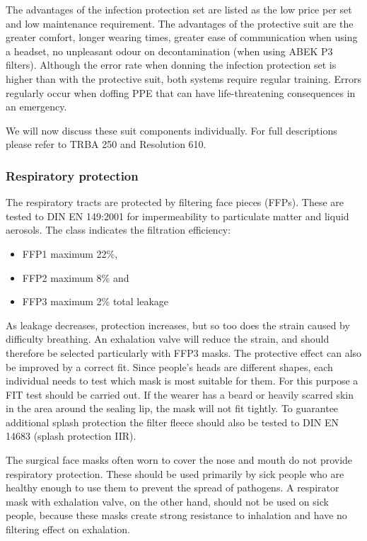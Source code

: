 \documentclass{article}
\begin{document}
The advantages of the infection protection set are listed as the low price per set and low maintenance requirement. The advantages of the protective suit are the greater comfort, longer wearing times, greater ease of communication when using a headset, no unpleasant odour on decontamination (when using ABEK P3 filters). Although the error rate when donning the infection protection set is higher than with the protective suit, both systems require regular training. Errors regularly occur when doffing PPE that can have life-threatening consequences in an emergency.


We will now discuss these suit components individually. For full descriptions please refer to TRBA 250 and Resolution 610.


\subsubsection{Respiratory protection}\label{H2703944}



The respiratory tracts are protected by filtering face pieces (FFPs). These are tested to DIN EN 149:2001 for impermeability to particulate matter and liquid aerosols. The class indicates the filtration efficiency:

\begin{itemize}
\item FFP1 maximum 22\%,


\item FFP2 maximum 8\% and


\item FFP3 maximum 2\% total leakage


\end{itemize}

As leakage decreases, protection increases, but so too does the strain caused by difficulty breathing. An exhalation valve will reduce the strain, and should therefore be selected particularly with FFP3 masks. The protective effect can also be improved by a correct fit. Since people's heads are different shapes, each individual needs to test which mask is most suitable for them. For this purpose a FIT test should be carried out. If the wearer has a beard or heavily scarred skin in the area around the sealing lip, the mask will not fit tightly. To guarantee additional splash protection the filter fleece should also be tested to DIN EN 14683 (splash protection IIR).


The surgical face masks often worn to cover the nose and mouth do not provide respiratory protection. These should be used primarily by sick people who are healthy enough to use them to prevent the spread of pathogens. A respirator mask with exhalation valve, on the other hand, should not be used on sick people, because these masks create strong resistance to inhalation and have no filtering effect on exhalation.
\end{document}
